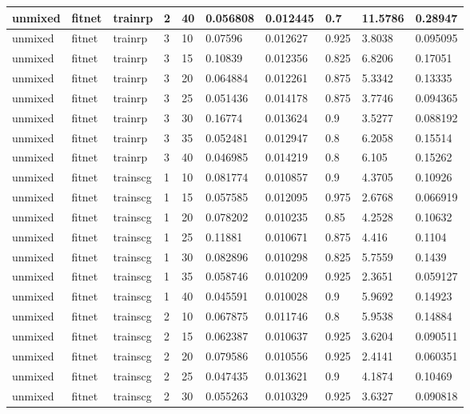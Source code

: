 \begin{longtable}{lllllllll}
unmixed & fitnet & trainrp & 2 & 40 & 0.056808 & 0.012445 & 0.7 & 11.5786 & 0.28947 \\ \hline 
unmixed & fitnet & trainrp & 3 & 10 & 0.07596 & 0.012627 & 0.925 & 3.8038 & 0.095095 \\ \hline 
unmixed & fitnet & trainrp & 3 & 15 & 0.10839 & 0.012356 & 0.825 & 6.8206 & 0.17051 \\ \hline 
unmixed & fitnet & trainrp & 3 & 20 & 0.064884 & 0.012261 & 0.875 & 5.3342 & 0.13335 \\ \hline 
unmixed & fitnet & trainrp & 3 & 25 & 0.051436 & 0.014178 & 0.875 & 3.7746 & 0.094365 \\ \hline 
unmixed & fitnet & trainrp & 3 & 30 & 0.16774 & 0.013624 & 0.9 & 3.5277 & 0.088192 \\ \hline 
unmixed & fitnet & trainrp & 3 & 35 & 0.052481 & 0.012947 & 0.8 & 6.2058 & 0.15514 \\ \hline 
unmixed & fitnet & trainrp & 3 & 40 & 0.046985 & 0.014219 & 0.8 & 6.105 & 0.15262 \\ \hline 
unmixed & fitnet & trainscg & 1 & 10 & 0.081774 & 0.010857 & 0.9 & 4.3705 & 0.10926 \\ \hline 
unmixed & fitnet & trainscg & 1 & 15 & 0.057585 & 0.012095 & 0.975 & 2.6768 & 0.066919 \\ \hline 
unmixed & fitnet & trainscg & 1 & 20 & 0.078202 & 0.010235 & 0.85 & 4.2528 & 0.10632 \\ \hline 
unmixed & fitnet & trainscg & 1 & 25 & 0.11881 & 0.010671 & 0.875 & 4.416 & 0.1104 \\ \hline 
unmixed & fitnet & trainscg & 1 & 30 & 0.082896 & 0.010298 & 0.825 & 5.7559 & 0.1439 \\ \hline 
unmixed & fitnet & trainscg & 1 & 35 & 0.058746 & 0.010209 & 0.925 & 2.3651 & 0.059127 \\ \hline 
unmixed & fitnet & trainscg & 1 & 40 & 0.045591 & 0.010028 & 0.9 & 5.9692 & 0.14923 \\ \hline 
unmixed & fitnet & trainscg & 2 & 10 & 0.067875 & 0.011746 & 0.8 & 5.9538 & 0.14884 \\ \hline 
unmixed & fitnet & trainscg & 2 & 15 & 0.062387 & 0.010637 & 0.925 & 3.6204 & 0.090511 \\ \hline 
unmixed & fitnet & trainscg & 2 & 20 & 0.079586 & 0.010556 & 0.925 & 2.4141 & 0.060351 \\ \hline 
unmixed & fitnet & trainscg & 2 & 25 & 0.047435 & 0.013621 & 0.9 & 4.1874 & 0.10469 \\ \hline 
unmixed & fitnet & trainscg & 2 & 30 & 0.055263 & 0.010329 & 0.925 & 3.6327 & 0.090818 \\ \hline 

\end{longtable}
